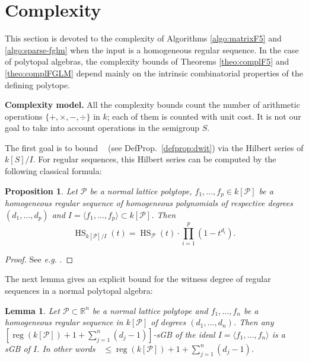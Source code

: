 \documentclass[12pt]{article}
\numberwithin{equation}{section}
\numberwithin{theorem}{section}
\newtheorem{proposition}[theorem]{Proposition}
\newtheorem{lemma}[theorem]{Lemma}
\DeclareMathOperator{\HS}{HS}
\newcommand{\sgp}{S}
\newcommand{\polytope}{\mathscr P}
\DeclareMathOperator{\reg}{reg}
\DeclareMathOperator{\dwit}{d_{wit}}
\newcommand{\R}{\mathbb{R}}
\begin{document}
\section{Complexity}\label{sec:complexity}
This section is devoted to the complexity of Algorithms \ref{algo:matrixF5} and \ref{algo:sparse-fglm} when the input is a homogeneous regular sequence. In the case of polytopal algebras, the complexity bounds of Theorems \ref{theo:complF5} and \ref{theo:complFGLM} depend mainly on the intrinsic combinatorial properties of the defining polytope.

\smallskip

{\bf Complexity model.} All the complexity bounds count
the number of arithmetic operations $\{+,\times,-,\div\}$ in
$k$; each of them is counted with unit cost. It is not our goal to
take into account operations in the semigroup $\sgp$.

\smallskip

The first goal is to bound $\dwit$ (see DefProp.~\ref{defprop:dwit}) via the Hilbert series of $k[\sgp]/I$. For regular sequences, this Hilbert series can be computed by the following classical formula:
\begin{proposition}\label{prop:HSsuitereg}
Let $\polytope$ be a normal lattice polytope, $f_1,\ldots, f_p\in k[\polytope]$ be a homogeneous regular sequence of homogeneous polynomials of respective degrees $(d_1,\ldots, d_p)$ and $I=\langle f_1,\ldots, f_p\rangle\subset k[\polytope]$. Then 
\[\HS_{k[\polytope]/I}(t)=\HS_{\polytope}(t)\cdot\prod_{i=1}^p (1-t^{d_i}).\]
\end{proposition}
\begin{proof}
See \emph{e.g.} \cite[Exercise 21.17b]{eisenbud1995commutative}.
\end{proof}
The next lemma gives an explicit bound for the witness degree of regular sequences in a normal polytopal algebra:
\begin{lemma}\label{lem:sparsedreg}
  Let $\polytope\subset\R^n$ be a normal lattice polytope and $f_1,\ldots, f_n$ be a homogeneous regular sequence in $k[\polytope]$ of degrees $(d_1,\ldots, d_n)$.
Then any $\left[\reg(k[\polytope])+1+\sum_{j=1}^n(d_j-1)\right]$-sGB  of the ideal $I=\langle f_1,\ldots,f_n\rangle$ is a sGB of $I$. In other words $\dwit\leq \reg(k[\polytope])+1+\sum_{j=1}^n(d_j-1)$.
\end{lemma}
\end{document}
